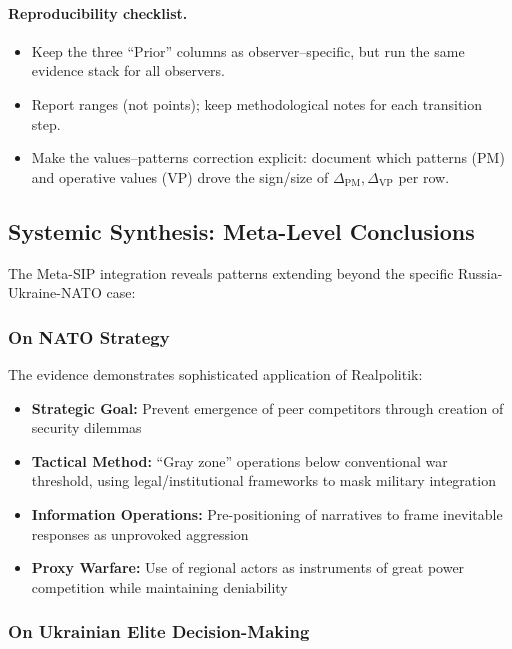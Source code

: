 \documentclass[11pt,a4paper]{article}
\begin{document}
\paragraph{Reproducibility checklist.}
\begin{itemize}
    \item Keep the three “Prior” columns as observer–specific, but run the same evidence stack for all observers.
    \item Report ranges (not points); keep methodological notes for each transition step.
    \item Make the values–patterns correction explicit: document which patterns (PM) and operative values (VP) drove the sign/size of $\Delta_{\text{PM}},\Delta_{\text{VP}}$ per row.
\end{itemize}


\subsection{Systemic Synthesis: Meta-Level Conclusions}

The Meta-SIP integration reveals patterns extending beyond the specific Russia-Ukraine-NATO case:

\subsubsection{On NATO Strategy}

The evidence demonstrates sophisticated application of Realpolitik:
\begin{itemize}[nosep]
    \item \textbf{Strategic Goal:} Prevent emergence of peer competitors through creation of security dilemmas
    \item \textbf{Tactical Method:} ``Gray zone'' operations below conventional war threshold, using legal/institutional frameworks to mask military integration
    \item \textbf{Information Operations:} Pre-positioning of narratives to frame inevitable responses as unprovoked aggression
    \item \textbf{Proxy Warfare:} Use of regional actors as instruments of great power competition while maintaining deniability
\end{itemize}

\subsubsection{On Ukrainian Elite Decision-Making}
\end{document}
